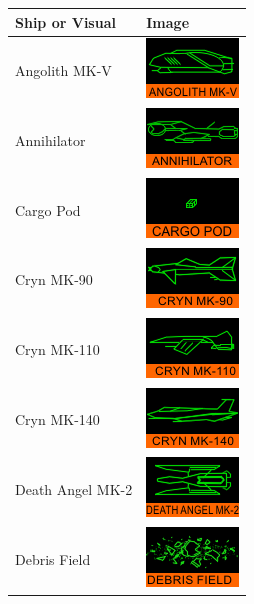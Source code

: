 \begin{itemize}
\begin{tabular}{ | l | l | }
\hline
Ship or Visual & Image \\
\hline
Angolith MK-V & \includegraphics{images/ship_angolith_mk-v.png} \\
Annihilator & \includegraphics{images/ship_annihilator.png} \\
Cargo Pod & \includegraphics{images/ship_cargo_pod.png} \\
Cryn MK-90 & \includegraphics{images/ship_cryn_mk-90.png} \\
Cryn MK-110 & \includegraphics{images/ship_cryn_mk-110.png} \\
Cryn MK-140 & \includegraphics{images/ship_cryn_mk-140.png} \\
Death Angel MK-2 & \includegraphics{images/ship_deathangel_mk-2.png} \\
Debris Field & \includegraphics{images/ship_debris_field.png} \\

\end{tabular}
\end{itemize}
